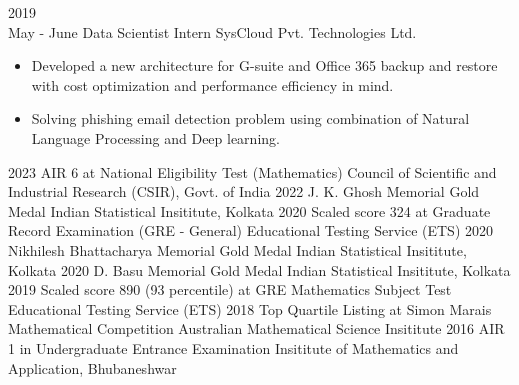 \documentclass[9pt]{developercv} %
\begin{document}
\begin{entrylist}
{\begin{itemize}[noitemsep,topsep=0pt,parsep=0pt,partopsep=0pt, leftmargin=-1pt]
        \end{itemize}
        }
	\entry
		{2019\\\footnotesize{May - June}}
		{Data Scientist Intern}
		{SysCloud Pvt. Technologies Ltd.}
		{\vspace{-10pt}
        \begin{itemize}[noitemsep,topsep=0pt,parsep=0pt,partopsep=0pt, leftmargin=-1pt]
            \item Developed a new architecture for G-suite and Office 365 backup and restore with cost optimization and performance efficiency in mind.
            \item Solving phishing email detection problem using combination of Natural Language Processing and Deep learning.
        \end{itemize}
        }
\end{entrylist}



\begin{entrylist}
    \vspace*{-0.5cm}
    \entry
        {2023}
        {AIR 6 at National Eligibility Test (Mathematics)}
        {Council of Scientific and Industrial Research (CSIR), Govt. of India}
        {}
    \vspace*{-0.5cm}
    \entry
        {2022}
        {J. K. Ghosh Memorial Gold Medal}
        {Indian Statistical Insititute, Kolkata}
        {}
    \vspace*{-0.5cm}
    \entry
        {2020}
        {Scaled score 324 at Graduate Record Examination (GRE - General)}
        {Educational Testing Service (ETS)}
        {}
    \vspace*{-0.5cm}
    \entry
        {2020}
        {Nikhilesh Bhattacharya Memorial Gold Medal}
        {Indian Statistical Insititute, Kolkata}
        {}
    \vspace*{-0.5cm}
    \entry
        {2020}
        {D. Basu Memorial Gold Medal}
        {Indian Statistical Insititute, Kolkata}
        {}
    \vspace*{-0.5cm}
    \entry
        {2019}
        {Scaled score 890 (93 percentile) at GRE Mathematics Subject Test}
        {Educational Testing Service (ETS)}
        {}
    \vspace*{-0.5cm}
    \entry
        {2018}
        {Top Quartile Listing at Simon Marais Mathematical Competition}
        {Australian Mathematical Science Insititute}
        {}
    \vspace*{-0.5cm}
    \entry
        {2016}
        {AIR 1 in Undergraduate Entrance Examination}
        {Insititute of Mathematics and Application, Bhubaneshwar}
        {}
\end{entrylist}
\end{document}
